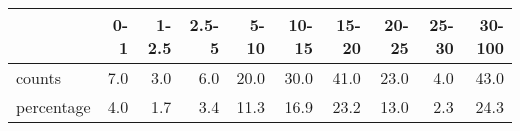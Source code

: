 \begin{table}[ht]
\centering
\begin{tabular}{lrrrrrrrrr}
  \hline
 & 0-1 & 1-2.5 & 2.5-5 & 5-10 & 10-15 & 15-20 & 20-25 & 25-30 & 30-100 \\ 
  \hline
counts & 7.0 & 3.0 & 6.0 & 20.0 & 30.0 & 41.0 & 23.0 & 4.0 & 43.0 \\ 
  percentage & 4.0 & 1.7 & 3.4 & 11.3 & 16.9 & 23.2 & 13.0 & 2.3 & 24.3 \\ 
   \hline
\end{tabular}
\end{table}
